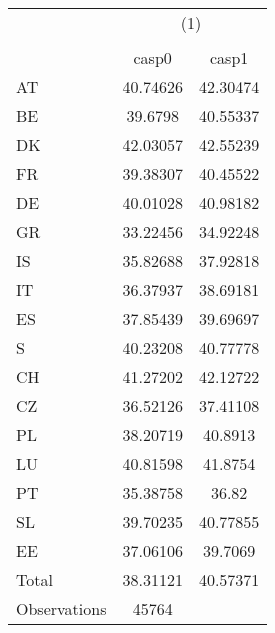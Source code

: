 {
\def\sym#1{\ifmmode^{#1}\else\(^{#1}\)\fi}
\begin{tabular}{l*{1}{cc}}
\hline\hline
                    &\multicolumn{2}{c}{(1)}  \\
                    &\multicolumn{2}{c}{}     \\
                    &       casp0&       casp1\\
\hline
AT                  &    40.74626&    42.30474\\
BE                  &     39.6798&    40.55337\\
DK                  &    42.03057&    42.55239\\
FR                  &    39.38307&    40.45522\\
DE                  &    40.01028&    40.98182\\
GR                  &    33.22456&    34.92248\\
IS                  &    35.82688&    37.92818\\
IT                  &    36.37937&    38.69181\\
ES                  &    37.85439&    39.69697\\
S                   &    40.23208&    40.77778\\
CH                  &    41.27202&    42.12722\\
CZ                  &    36.52126&    37.41108\\
PL                  &    38.20719&     40.8913\\
LU                  &    40.81598&     41.8754\\
PT                  &    35.38758&       36.82\\
SL                  &    39.70235&    40.77855\\
EE                  &    37.06106&     39.7069\\
Total               &    38.31121&    40.57371\\
\hline
Observations        &       45764&            \\
\hline\hline
\end{tabular}
}
